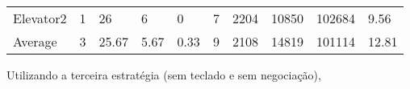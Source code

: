 ﻿\documentclass[a4paper]{article}
\begin{document}
\begin{table}[h]
\begin{tabular}{@{}llllllllll@{}}
Elevator2 & 1        & 26            & 6           & 0                                                               & 7                                                                  & 2204                                                         & 10850                                                 & 102684                                                   & 9.56         \\
Average   & 3     & 25.67         & 5.67        & 0.33                                                               & 9                                                               & 2108                                                         & 14819                                                 & 101114                                                   &  12.81         \\ \bottomrule
\end{tabular}
\end{table}

Utilizando a terceira estratégia (sem teclado e sem negociação),
\end{document}
